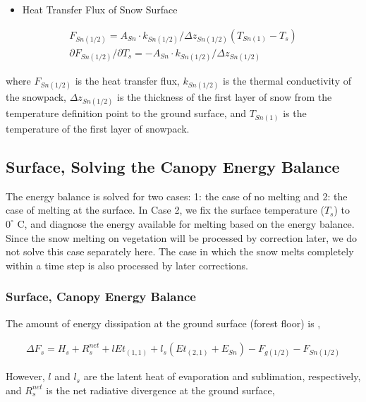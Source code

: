 \begin{itemize}
\tightlist
\item
  Heat Transfer Flux of Snow Surface
\end{itemize}

\begin{eqnarray}
  F_{Sn(1/2)} = A_{Sn} \cdot k_{Sn(1/2)} / \Delta z_{Sn(1/2)} (T_{Sn(1)} - T_s)
 \\
  \partial F_{Sn(1/2)}/\partial T_s =
  - A_{Sn} \cdot k_{Sn(1/2)} / \Delta z_{Sn(1/2)}
\end{eqnarray}

where \(F_{Sn(1/2)}\) is the heat transfer flux, \(k_{Sn(1/2)}\) is the
thermal conductivity of the snowpack, \(\Delta z_{Sn(1/2)}\) is the
thickness of the first layer of snow from the temperature definition
point to the ground surface, and \(T_{Sn(1)}\) is the temperature of the
first layer of snowpack.

\hypertarget{surface-solving-the-canopy-energy-balance}{%
\subsection{Surface, Solving the Canopy Energy
Balance}\label{surface-solving-the-canopy-energy-balance}}

The energy balance is solved for two cases: 1: the case of no melting
and 2: the case of melting at the surface. In Case 2, we fix the surface
temperature (\(T_s\)) to \(0^{\circ}\) C, and diagnose the energy
available for melting based on the energy balance. Since the snow
melting on vegetation will be processed by correction later, we do not
solve this case separately here. The case in which the snow melts
completely within a time step is also processed by later corrections.

\hypertarget{surface-canopy-energy-balance}{%
\subsubsection{Surface, Canopy Energy
Balance}\label{surface-canopy-energy-balance}}

The amount of energy dissipation at the ground surface (forest floor) is
,

\begin{eqnarray}
 \Delta F_s =
  H_s + R^{net}_s + l Et_{(1,1)} + l_s ( Et_{(2,1)} + E_{Sn} )
  - F_{g(1/2)} - F_{Sn(1/2)}
\end{eqnarray}

However, \(l\) and \(l_s\) are the latent heat of evaporation and
sublimation, respectively, and \(R^{net}_s\) is the net radiative
divergence at the ground surface,

